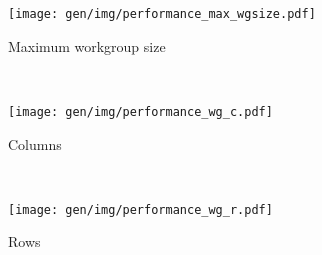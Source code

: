 \begin{subfigure}[h]{\textwidth}
\centering
\texttt{[image: gen/img/performance\_max\_wgsize.pdf]}
\vspace{-1.5em} %
\caption{Maximum workgroup size}
\label{fig:performance-max-wgsize}
\end{subfigure}
\\
\begin{subfigure}[h]{.48\textwidth}
\centering
\texttt{[image: gen/img/performance\_wg\_c.pdf]}
\vspace{-1.5em} %
\caption{Columns}
\label{fig:performance-wg-c}
\end{subfigure}
~%
\begin{subfigure}[h]{.48\textwidth}
\centering
\texttt{[image: gen/img/performance\_wg\_r.pdf]}
\vspace{-1.5em} %
\caption{Rows}
\label{fig:performance-wg-r}
\end{subfigure}
